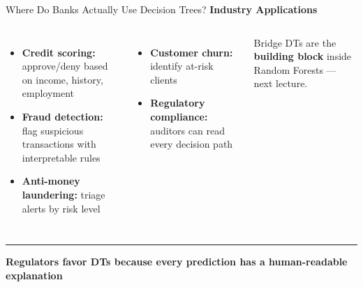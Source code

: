 \documentclass[8pt,aspectratio=169]{beamer}
\newcommand{\bottomnote}[1]{%
\vfill
\vspace{-2mm}
\textcolor{mllavender2}{\rule{\textwidth}{0.4pt}}
\vspace{1mm}
\footnotesize
\textbf{#1}
}
\newenvironment{compactlist}{%
  \begin{itemize}%
    \setlength{\itemsep}{2pt}%
    \setlength{\parskip}{0pt}%
    \setlength{\parsep}{0pt}%
}{%
  \end{itemize}%
}
\newcommand{\highlight}[1]{\textcolor{mlorange}{\textbf{#1}}}
\begin{document}
\begin{frame}[t]{Where Do Banks Actually Use Decision Trees?}
\small
\textbf{Industry Applications}
\begin{columns}[T]
\begin{compactlist}
\item \footnotesize \textbf{Credit scoring:} approve/deny based on income, history, employment
\item \footnotesize \textbf{Fraud detection:} flag suspicious transactions with interpretable rules
\item \footnotesize \textbf{Anti-money laundering:} triage alerts by risk level
\end{compactlist}

\begin{compactlist}
\item \footnotesize \textbf{Customer churn:} identify at-risk clients
\item \footnotesize \textbf{Regulatory compliance:} auditors can read every decision path
\end{compactlist}
\vspace{3mm}
\begin{block}{Bridge}
\footnotesize DTs are the \highlight{building block} inside Random Forests --- next lecture.
\end{block}
\end{columns}
\bottomnote{Regulators favor DTs because every prediction has a human-readable explanation}
\end{frame}
\end{document}
